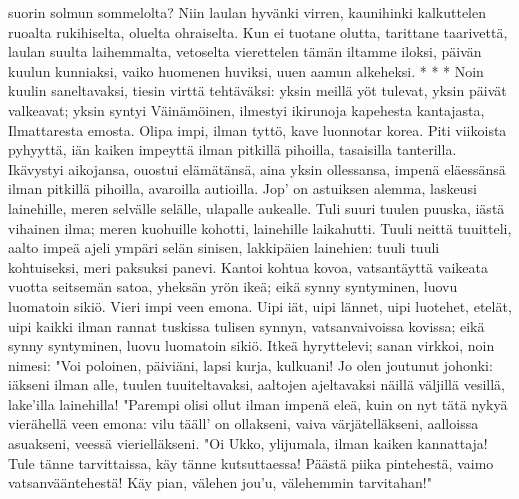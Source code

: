     suorin solmun sommelolta?
  \endverse
  \beginverse
    Niin laulan hyvänki virren,
    kaunihinki kalkuttelen
    ruoalta rukihiselta,
    oluelta ohraiselta.
    Kun ei tuotane olutta,
    tarittane taarivettä,
    laulan suulta laihemmalta,
    vetoselta vierettelen
    tämän iltamme iloksi,
    päivän kuulun kunniaksi,
    vaiko huomenen huviksi,
    uuen aamun alkeheksi.
    * * *
  \endverse
  \beginverse
    Noin kuulin saneltavaksi,
    tiesin virttä tehtäväksi:
    yksin meillä yöt tulevat,
    yksin päivät valkeavat;
    yksin syntyi Väinämöinen,
    ilmestyi ikirunoja
    kapehesta kantajasta,
    Ilmattaresta emosta.
  \endverse
  \beginverse
    Olipa impi, ilman tyttö,
    kave luonnotar korea.
    Piti viikoista pyhyyttä,
    iän kaiken impeyttä
    ilman pitkillä pihoilla,
    tasaisilla tanterilla.
    Ikävystyi aikojansa,
    ouostui elämätänsä,
    aina yksin ollessansa,
    impenä eläessänsä
  \endverse
  \beginverse
    ilman pitkillä pihoilla,
    avaroilla autioilla.
    Jop' on astuiksen alemma,
    laskeusi lainehille,
    meren selvälle selälle,
    ulapalle aukealle.
    Tuli suuri tuulen puuska,
    iästä vihainen ilma;
    meren kuohuille kohotti,
    lainehille laikahutti.
  \endverse
  \beginverse
    Tuuli neittä tuuitteli,
    aalto impeä ajeli
    ympäri selän sinisen,
    lakkipäien lainehien:
    tuuli tuuli kohtuiseksi,
    meri paksuksi panevi.
    Kantoi kohtua kovoa,
    vatsantäyttä vaikeata
    vuotta seitsemän satoa,
    yheksän yrön ikeä;
  \endverse
  \beginverse
    eikä synny syntyminen,
    luovu luomatoin sikiö.
    Vieri impi veen emona.
    Uipi iät, uipi lännet,
    uipi luotehet, etelät,
    uipi kaikki ilman rannat
    tuskissa tulisen synnyn,
    vatsanvaivoissa kovissa;
    eikä synny syntyminen,
    luovu luomatoin sikiö.
  \endverse
  \beginverse
    Itkeä hyryttelevi;
    sanan virkkoi, noin nimesi:
    "Voi poloinen, päiviäni,
    lapsi kurja, kulkuani!
    Jo olen joutunut johonki:
    iäkseni ilman alle,
    tuulen tuuiteltavaksi,
    aaltojen ajeltavaksi
    näillä väljillä vesillä,
    lake'illa lainehilla!
  \endverse
  \beginverse
    "Parempi olisi ollut
    ilman impenä eleä,
    kuin on nyt tätä nykyä
    vierähellä veen emona:
    vilu tääll' on ollakseni,
    vaiva värjätelläkseni,
    aalloissa asuakseni,
    veessä vierielläkseni.
    "Oi Ukko, ylijumala,
    ilman kaiken kannattaja!
  \endverse
  \beginverse
    Tule tänne tarvittaissa,
    käy tänne kutsuttaessa!
    Päästä piika pintehestä,
    vaimo vatsanvääntehestä!
    Käy pian, välehen jou'u,
    välehemmin tarvitahan!"
